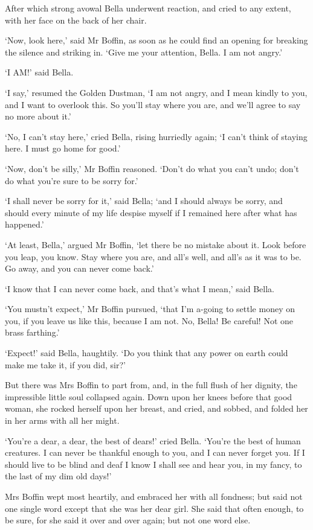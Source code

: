After which strong avowal Bella underwent reaction, and cried to any
extent, with her face on the back of her chair.

‘Now, look here,’ said Mr Boffin, as soon as he could find an opening
for breaking the silence and striking in. ‘Give me your attention,
Bella. I am not angry.’

‘I AM!’ said Bella.

‘I say,’ resumed the Golden Dustman, ‘I am not angry, and I mean kindly
to you, and I want to overlook this. So you’ll stay where you are, and
we’ll agree to say no more about it.’

‘No, I can’t stay here,’ cried Bella, rising hurriedly again; ‘I can’t
think of staying here. I must go home for good.’

‘Now, don’t be silly,’ Mr Boffin reasoned. ‘Don’t do what you can’t
undo; don’t do what you’re sure to be sorry for.’

‘I shall never be sorry for it,’ said Bella; ‘and I should always be
sorry, and should every minute of my life despise myself if I remained
here after what has happened.’

‘At least, Bella,’ argued Mr Boffin, ‘let there be no mistake about it.
Look before you leap, you know. Stay where you are, and all’s well, and
all’s as it was to be. Go away, and you can never come back.’

‘I know that I can never come back, and that’s what I mean,’ said Bella.

‘You mustn’t expect,’ Mr Boffin pursued, ‘that I’m a-going to settle
money on you, if you leave us like this, because I am not. No, Bella! Be
careful! Not one brass farthing.’

‘Expect!’ said Bella, haughtily. ‘Do you think that any power on earth
could make me take it, if you did, sir?’

But there was Mrs Boffin to part from, and, in the full flush of her
dignity, the impressible little soul collapsed again. Down upon her
knees before that good woman, she rocked herself upon her breast, and
cried, and sobbed, and folded her in her arms with all her might.

‘You’re a dear, a dear, the best of dears!’ cried Bella. ‘You’re the
best of human creatures. I can never be thankful enough to you, and I
can never forget you. If I should live to be blind and deaf I know I
shall see and hear you, in my fancy, to the last of my dim old days!’

Mrs Boffin wept most heartily, and embraced her with all fondness; but
said not one single word except that she was her dear girl. She said
that often enough, to be sure, for she said it over and over again; but
not one word else.

